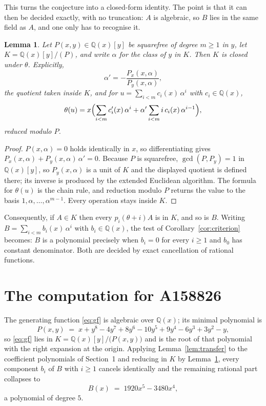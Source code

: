 \documentclass[11pt,a4paper]{article}
\theoremstyle{plain}
\newtheorem{lemma}[theorem]{Lemma}
\theoremstyle{definition}
\begin{document}
This turns the conjecture into a closed-form identity. The point is that it can then be
decided exactly, with no truncation: $A$ is algebraic, so $B$ lies in the same field as
$A$, and one only has to recognise it.

\begin{lemma}\label{lem:field}
Let $P(x,y)\in\mathbb{Q}(x)[y]$ be squarefree of degree $m\ge1$ in $y$, let
$K=\mathbb{Q}(x)[y]/(P)$, and write $\alpha$ for the class of $y$ in $K$. Then $K$ is
closed under $\theta$. Explicitly,
\[
\alpha'=-\frac{P_{x}(x,\alpha)}{P_{y}(x,\alpha)},
\]
the quotient taken inside $K$, and for $u=\sum_{i<m}c_{i}(x)\,\alpha^{i}$ with
$c_{i}\in\mathbb{Q}(x)$,
\[
\theta(u)=x\Bigl(\sum_{i<m}c_{i}'(x)\,\alpha^{i}
 +\alpha'\sum_{i<m}i\,c_{i}(x)\,\alpha^{i-1}\Bigr),
\]
reduced modulo $P$.
\end{lemma}

\begin{proof}
$P(x,\alpha)=0$ holds identically in $x$, so differentiating gives
$P_{x}(x,\alpha)+P_{y}(x,\alpha)\,\alpha'=0$. Because $P$ is squarefree,
$\gcd(P,P_{y})=1$ in $\mathbb{Q}(x)[y]$, so $P_{y}(x,\alpha)$ is a unit of $K$ and the
displayed quotient is defined there; its inverse is produced by the extended Euclidean
algorithm. The formula for $\theta(u)$ is the chain rule, and reduction modulo $P$ returns
the value to the basis $1,\alpha,\dots,\alpha^{m-1}$. Every operation stays inside $K$.
\end{proof}

Consequently, if $A\in K$ then every $p_{i}(\theta+i)A$ is in $K$, and so is $B$. Writing
$B=\sum_{i<m}b_{i}(x)\,\alpha^{i}$ with $b_{i}\in\mathbb{Q}(x)$, the test of
Corollary~\ref{cor:criterion} becomes: $B$ is a polynomial precisely when $b_{i}=0$ for
every $i\ge1$ and $b_{0}$ has constant denominator. Both are decided by exact
cancellation of rational functions.

\section{The computation for A158826}

The generating function \eqref{eq:gf} is algebraic over $\mathbb{Q}(x)$;
its minimal polynomial is
\[
P(x,y) \;=\; x + y^{8} - 4 y^{7} + 8 y^{6} - 10 y^{5} + 9 y^{4} - 6 y^{3} + 3 y^{2} - y ,
\]
so \eqref{eq:gf} lies in $K=\mathbb{Q}(x)[y]/\bigl(P(x,y)\bigr)$ and is the root of that polynomial with the right
expansion at the origin. Applying Lemma~\ref{lem:transfer} to the coefficient polynomials
of Section~1 and reducing in $K$ by Lemma~\ref{lem:field}, every component $b_{i}$ of $B$
with $i\ge1$ cancels identically and the remaining rational part collapses to
\[
B(x)\;=\;1920 x^{5} - 3480 x^{4} ,
\]
a polynomial of degree $5$.
\end{document}
